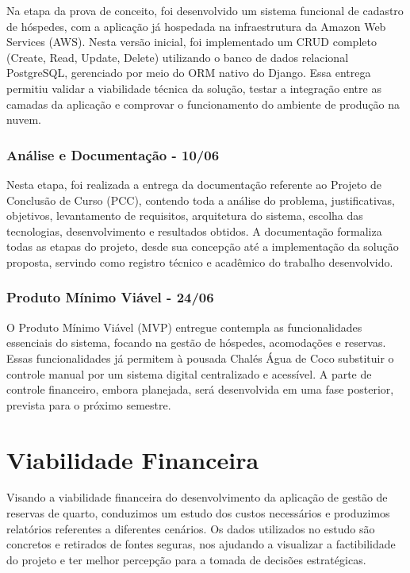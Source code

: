 \documentclass[
	12pt,				%
	openany,			%
	twoside,			%
	a4paper,			%
	english,			%
	french,				%
	spanish,			%
	brazil				%
	]{abntex2}
\begin{document}
Na etapa da prova de conceito, foi desenvolvido um sistema funcional de cadastro de hóspedes, com a aplicação já hospedada na infraestrutura da Amazon Web Services (AWS). Nesta versão inicial, foi implementado um CRUD completo (Create, Read, Update, Delete) utilizando o banco de dados relacional PostgreSQL, gerenciado por meio do ORM nativo do Django. Essa entrega permitiu validar a viabilidade técnica da solução, testar a integração entre as camadas da aplicação e comprovar o funcionamento do ambiente de produção na nuvem.

\subsection{Análise e Documentação - 10/06}

Nesta etapa, foi realizada a entrega da documentação referente ao Projeto de Conclusão de Curso (PCC), contendo toda a análise do problema, justificativas, objetivos, levantamento de requisitos, arquitetura do sistema, escolha das tecnologias, desenvolvimento e resultados obtidos. A documentação formaliza todas as etapas do projeto, desde sua concepção até a implementação da solução proposta, servindo como registro técnico e acadêmico do trabalho desenvolvido.

\subsection{Produto Mínimo Viável - 24/06}

O Produto Mínimo Viável (MVP) entregue contempla as funcionalidades essenciais do sistema, focando na gestão de hóspedes, acomodações e reservas. Essas funcionalidades já permitem à pousada Chalés Água de Coco substituir o controle manual por um sistema digital centralizado e acessível. A parte de controle financeiro, embora planejada, será desenvolvida em uma fase posterior, prevista para o próximo semestre.


\chapter{Viabilidade Financeira}
Visando a viabilidade financeira do desenvolvimento da aplicação de gestão de reservas de quarto, conduzimos um estudo dos custos necessários e produzimos relatórios referentes a diferentes cenários. Os dados utilizados no estudo são concretos e retirados de fontes seguras, nos ajudando a visualizar a factibilidade do projeto e ter melhor percepção para a tomada de decisões estratégicas.
\end{document}

